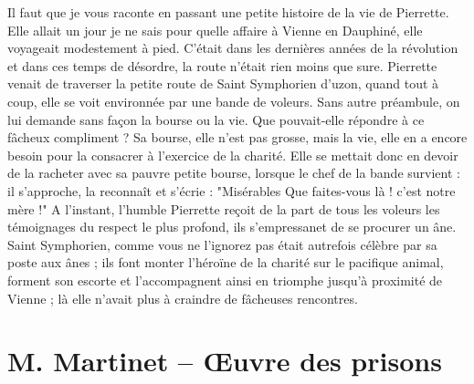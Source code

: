 \documentclass[11pt,a4paper]{report}
\begin{document}
Il faut que je vous raconte en passant une petite histoire de la vie de Pierrette. Elle allait un jour je ne sais pour quelle affaire à Vienne en Dauphiné, elle voyageait modestement à pied. C'était dans les dernières années de la révolution et dans ces temps de désordre, la route n'était rien moins que sure. Pierrette venait de traverser la petite route de Saint Symphorien d'uzon, quand tout à coup, elle se voit environnée par une bande de voleurs. Sans autre préambule, on lui demande sans façon la bourse ou la vie. Que pouvait-elle répondre à ce fâcheux compliment ? Sa bourse, elle n'est pas grosse, mais la vie, elle en a encore besoin pour la consacrer à l'exercice de la charité. Elle se mettait donc en devoir de la racheter avec sa pauvre petite bourse, lorsque le chef de la bande survient : il s'approche, la reconnaît et s'écrie : "Misérables Que faites-vous là ! c'est notre mère !" A l'instant, l'humble Pierrette reçoit de la part de tous les voleurs les témoignages du respect le plus profond, ils s'empressanet de se procurer un âne. Saint Symphorien, comme vous ne l'ignorez pas était autrefois célèbre par sa poste aux ânes ; ils font monter l'héroïne de la charité sur le pacifique animal, forment son escorte et l'accompagnent ainsi en triomphe jusqu'à proximité de Vienne ; là elle n'avait plus à craindre de fâcheuses rencontres.

\section*{M. Martinet -- Œuvre des prisons}
\end{document}
